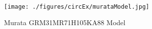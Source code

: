 \begin{figure}[ht!]
\texttt{[image: ./figures/circEx/murataModel.jpg]}
\centering
\caption{Murata GRM31MR71H105KA88 Model~\cite{simSurfing}}
\label{fig:murataModel}
\end{figure}

